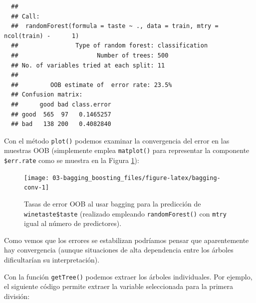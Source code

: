 \documentclass[
]{book}
\newenvironment{Shaded}{\begin{snugshade}}{\end{snugshade}}
\newcommand{\AttributeTok}[1]{\textcolor[rgb]{0.77,0.63,0.00}{#1}}
\newcommand{\ConstantTok}[1]{\textcolor[rgb]{0.00,0.00,0.00}{#1}}
\newcommand{\ControlFlowTok}[1]{\textcolor[rgb]{0.13,0.29,0.53}{\textbf{#1}}}
\newcommand{\DecValTok}[1]{\textcolor[rgb]{0.00,0.00,0.81}{#1}}
\newcommand{\FunctionTok}[1]{\textcolor[rgb]{0.00,0.00,0.00}{#1}}
\newcommand{\NormalTok}[1]{#1}
\newcommand{\OtherTok}[1]{\textcolor[rgb]{0.56,0.35,0.01}{#1}}
\newcommand{\SpecialCharTok}[1]{\textcolor[rgb]{0.00,0.00,0.00}{#1}}
\newcommand{\StringTok}[1]{\textcolor[rgb]{0.31,0.60,0.02}{#1}}
\theoremstyle{break}
\theoremstyle{nonumberplain}
\begin{document}
\begin{verbatim}
  ## 
  ## Call:
  ##  randomForest(formula = taste ~ ., data = train, mtry = ncol(train) -      1) 
  ##                Type of random forest: classification
  ##                      Number of trees: 500
  ## No. of variables tried at each split: 11
  ## 
  ##         OOB estimate of  error rate: 23.5%
  ## Confusion matrix:
  ##      good bad class.error
  ## good  565  97   0.1465257
  ## bad   138 200   0.4082840
\end{verbatim}

Con el método \texttt{plot()} podemos examinar la convergencia del error en las muestras OOB (simplemente emplea \texttt{matplot()} para representar la componente \texttt{\$err.rate} como se muestra en la Figura \ref{fig:bagging-conv}):



\begin{Shaded}
\end{Shaded}

\begin{figure}[!htb]

{\centering \texttt{[image: 03-bagging\_boosting\_files/figure-latex/bagging-conv-1]} 

}

\caption{Tasas de error OOB al usar bagging para la predicción de \texttt{winetaste\$taste} (realizado empleando \texttt{randomForest()} con \texttt{mtry} igual al número de predictores).}\label{fig:bagging-conv}
\end{figure}

Como vemos que los errores se estabilizan podríamos pensar que aparentemente hay convergencia (aunque situaciones de alta dependencia entre los árboles dificultarían su interpretación).

Con la función \texttt{getTree()} podemos extraer los árboles individuales.
Por ejemplo, el siguiente código permite extraer la variable seleccionada para la primera división:

\begin{Shaded}
\end{Shaded}
\end{document}
